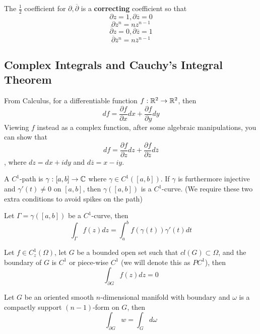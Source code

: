 \begin{remark}
    The $\frac{1}{2}$ coefficient for $\partial, \overline{\partial}$ is a \textbf{correcting} coefficient so that
    \[\partial z = 1, \partial \overline{z} = 0\]
    \[\partial z^n = n z^{n-1}\]
    \[\overline{\partial} z = 0, \overline{\partial} \overline{z} = 1\]
    \[\overline{\partial} \overline{z}^n = n \overline{z}^{n-1}\]
\end{remark}

\subsection{Complex Integrals and Cauchy's Integral Theorem}

From Calculus, for a differentiable function $f: \mathbb{R}^2 \to \mathbb{R}^2$, then
\[df = \frac{\partial f}{\partial x} dx + \frac{\partial f}{\partial y} dy\]
Viewing $f$ instead as a complex function, after some algebraic manipulations, you can show that
\[df = \frac{\partial f}{\partial z} dz + \frac{\partial f}{\partial \overline{z}} d\overline{z}\]
, where $dz = dx + idy$ and $d\overline{z} = x - iy$.

\begin{definition}
A $C^1$-path is $\gamma: [a, b] \to \mathbb{C}$ where $\gamma \in C^1([a, b])$. If $\gamma$ is furthermore injective and $\gamma'(t) \neq 0$ on $[a, b]$, then $\gamma([a, b])$ is a $C^1$-curve. (We require these two extra conditions to avoid spikes on the path)
\end{definition}

\begin{definition}
Let $\Gamma = \gamma([a, b])$ be a $C^1$-curve, then
\[\int_\Gamma f(z) dz = \int_a^b f(\gamma(t)) \gamma'(t) dt\]
\end{definition}

\begin{theorem}
Let $f \in C^1_z(\Omega)$, let $G$ be a bounded open set such that $cl(G) \subset \Omega$, and the boundary of $G$ is $C^1$ or piece-wise $C^1$ (we will denote this as $PC^1$), then
\[\int_{\partial G} f(z) dz = 0\]
\end{theorem}

\begin{theorem}
Let $G$ be an oriented smooth $n$-dimensional manifold with boundary and $\omega$ is a compactly support $(n-1)$-form on $G$, then
\[\int_{\partial G} w = \int_G d \omega\]
\end{theorem}

